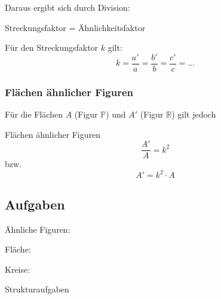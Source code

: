 Daraus ergibt sich durch Division:


\begin{gesetz}{Streckungsfaktor
    = Ähnlichkeitsfaktor}{}

  Für den Streckungsfaktor $k$ gilt:
  $$k = \frac{a'}{a} = \frac{b'}{b} = \frac{c'}{c} = ...$$
\end{gesetz}

\newpage

\subsubsection{Flächen ähnlicher Figuren}
Für die Flächen $A$ (Figur $\mathbb{P}$) und $A'$ (Figur $\mathbb{R}$) gilt jedoch

\begin{gesetz}{Flächen ähnlicher Figuren}{}
  $$\frac{A'}{A} = k^2$$
  bzw.
  $$A' = k^2 \cdot{} A$$
\end{gesetz}


\subsection*{Aufgaben}

Ähnliche Figuren:

Fläche:

Kreise:


Strukturaufgaben




